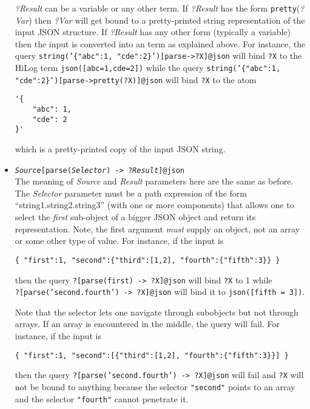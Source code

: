 \begin{itemize}
  \emph{?Result} can be a variable or any other term. If  \emph{?Result}
  has the form \texttt{pretty}(\emph{?Var})  then \emph{?Var}
  will get bound to a pretty-printed string representation of the input
  JSON structure. If \emph{?Result} has any other form (typically a
  variable) then the input is converted into an \ERGO term as explained
  above.
  For instance, the query 
  \texttt{string('\{"abc":1, "cde":2\}')[parse->?X]@\bs{}json}   
  will bind \texttt{?X} to the \ERGO HiLog term \texttt{json([abc=1,cde=2])}
  while the query  \texttt{string('\{"abc":1,
    "cde":2\}')[parse->pretty(?X)]@\bs{}json}  will bind \texttt{?X} to the atom
\begin{verbatim}
'{
    "abc": 1,
    "cde": 2
}'
\end{verbatim}
  which is a pretty-printed copy of the input JSON string.
\item
  \texttt{\emph{Source}[parse(\emph{Selector}) -> ?\emph{Result}]@\bs{}json}\\
  The meaning of \emph{Source}  and \emph{Result}  parameters here are the
  same as before.
  The \emph{Selector} parameter must be a path expression of the form
  ``string1.string2.string3'' (with one or more components) that allows
  one to select the \emph{first} sub-object of a bigger JSON object and
  return its
  representation. Note, the first argument \emph{must} supply an object, not an
  array or some other type of value. For instance, if the input is
\begin{verbatim}
{ "first":1, "second":{"third":[1,2], "fourth":{"fifth":3}} }  
\end{verbatim}
  then the query \texttt{?[parse(first) -> ?X]@\bs{}json} will bind
  \texttt{?X} to 1 while
  \\
  \texttt{?[parse('second.fourth') -> ?X]@\bs{}json} will bind it to
  \texttt{json([fifth = 3])}.

  Note that the selector lets one navigate through subobjects but not
  through arrays. If an array is encountered in the middle, the query will
  fail. For instance, if the input is
\begin{verbatim}
{ "first":1, "second":[{"third":[1,2], "fourth":{"fifth":3}}] }  
\end{verbatim}
  then the query \texttt{?[parse('second.fourth') -> ?X]@\bs{}json}
  will fail and \texttt{?X} will not be bound to anything because the
  selector \texttt{"second"} points to an array and the selector
  \texttt{"fourth"} cannot penetrate it. 


\end{itemize}

